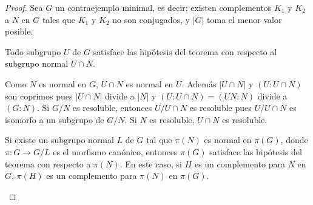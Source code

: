 %
%
%

\begin{proof}
	Sea $G$ un contraejemplo minimal, es decir: existen complementos $K_1$ y
	$K_2$ a $N$ en $G$ tales que $K_1$ y $K_2$ no son conjugados, y $|G|$ toma
	el menor valor posible.

	\begin{claim}
		Todo subgrupo $U$ de $G$ satisface las hipótesis del teorema con
		respecto al subgrupo normal $U\cap N$.
	\end{claim}
	
	Como $N$ es normal en $G$, $U\cap N$ es normal en $U$. Además $|U\cap N|$ y
	$(U:U\cap N)$ son coprimos pues $|U\cap N|$ divide a $|N|$ y $(U:U\cap
	N)=(UN:N)$ divide a $(G:N)$.  Si $G/N$ es resoluble, entonces $U/U\cap N$
	es resoluble pues $U/U\cap N$ es isomorfo a un subgrupo de $G/N$. Si $N$ es
	resoluble, $U\cap N$ es resoluble.
%

	\begin{claim}
		Si existe un subgrupo normal $L$ de $G$ tal que $\pi(N)$ es normal en
		$\pi(G)$, donde $\pi\colon G\to G/L$ es el morfismo canónico, entonces
		$\pi(G)$ satisface las hipótesis del teorema con respecto a $\pi(N)$.
		En este caso, si $H$ es un complemento para $N$ en $G$, $\pi(H)$ es un
		complemento para $\pi(N)$ en $\pi(G)$.
	\end{claim}


\end{proof}
